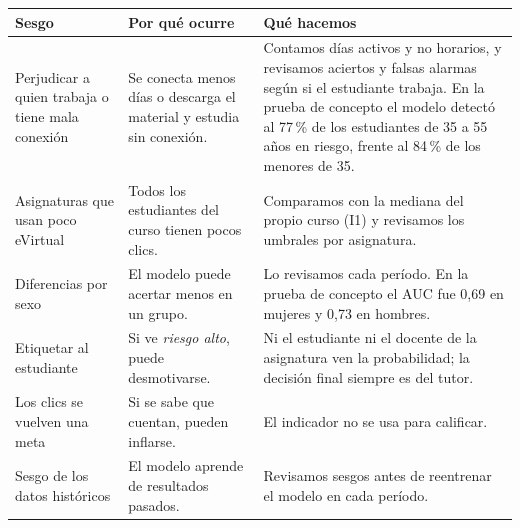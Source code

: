 \documentclass[10pt]{article}
\begin{document}
{\small
\begin{longtable}{P{5.2cm} P{7.2cm} P{11.8cm}}
\toprule
\textbf{Sesgo} & \textbf{Por qué ocurre} & \textbf{Qué hacemos}\\
\midrule
\endhead
\bottomrule
\endfoot
Perjudicar a quien trabaja o tiene mala conexión & Se conecta menos días o descarga el material y estudia sin conexión. & Contamos días activos y no horarios, y revisamos aciertos y falsas alarmas según si el estudiante trabaja. En la prueba de concepto el modelo detectó al 77\,\% de los estudiantes de 35 a 55 años en riesgo, frente al 84\,\% de los menores de 35.\\
Asignaturas que usan poco eVirtual & Todos los estudiantes del curso tienen pocos clics. & Comparamos con la mediana del propio curso (I1) y revisamos los umbrales por asignatura.\\
Diferencias por sexo & El modelo puede acertar menos en un grupo. & Lo revisamos cada período. En la prueba de concepto el AUC fue 0,69 en mujeres y 0,73 en hombres.\\
Etiquetar al estudiante & Si ve \emph{riesgo alto}, puede desmotivarse. & Ni el estudiante ni el docente de la asignatura ven la probabilidad; la decisión final siempre es del tutor.\\
Los clics se vuelven una meta & Si se sabe que cuentan, pueden inflarse. & El indicador no se usa para calificar.\\
Sesgo de los datos históricos & El modelo aprende de resultados pasados. & Revisamos sesgos antes de reentrenar el modelo en cada período.\\
\end{longtable}
}
\end{document}

